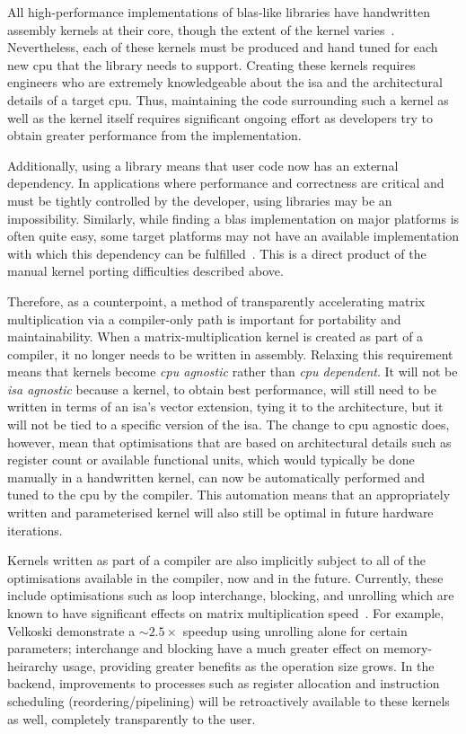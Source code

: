 \documentclass[\main/thesis.tex]{subfiles}
\begin{document}
All high-performance implementations of \gls{blas}-like libraries have handwritten assembly kernels at their core, though the extent of the kernel varies~\autocite{zee2016blis}.
Nevertheless, each of these kernels must be produced and hand tuned for each new \gls{cpu} that the library needs to support.
Creating these kernels requires engineers who are extremely knowledgeable about the \gls{isa} and the architectural details of a target \gls{cpu}.
Thus, maintaining the code surrounding such a kernel as well as the kernel itself requires significant ongoing effort as developers try to obtain greater performance from the implementation.

Additionally, using a library means that user code now has an external dependency.
In applications where performance and correctness are critical and must be tightly controlled by the developer, using libraries may be an impossibility.
Similarly, while finding a \gls{blas} implementation on major platforms is often quite easy, some target platforms may not have an available implementation with which this dependency can be fulfilled~\autocite{zee2016blis}.
This is a direct product of the manual kernel porting difficulties described above.

Therefore, as a counterpoint, a method of transparently accelerating matrix multiplication via a compiler-only path is important for portability and maintainability.
When a matrix-multiplication kernel is created as part of a compiler, it no longer needs to be written in assembly.
Relaxing this requirement means that kernels become \emph{\gls{cpu} agnostic} rather than \emph{\gls{cpu} dependent}.
It will not be \emph{\gls{isa} agnostic} because a kernel, to obtain best performance, will still need to be written in terms of an \gls{isa}'s vector extension, tying it to the architecture, but it will not be tied to a specific version of the \gls{isa}.
The change to \gls{cpu} agnostic does, however, mean that optimisations that are based on architectural details such as register count or available functional units, which would typically be done manually in a handwritten kernel, can now be automatically performed and tuned to the \gls{cpu} by the compiler.
This automation means that an appropriately written and parameterised kernel will also still be optimal in future hardware iterations.

Kernels written as part of a compiler are also implicitly subject to all of the optimisations available in the compiler, now and in the future.
Currently, these include optimisations such as loop interchange, blocking, and unrolling which are known to have significant effects on matrix multiplication speed~\autocite{velkoski2014performance,allen1984automatic,fabeiro2016writing,schreiber1990automatic}.
For example, Velkoski \etal demonstrate a $\sim 2.5 \times$ speedup using unrolling alone for certain parameters; interchange and blocking have a much greater effect on memory-heirarchy usage, providing greater benefits as the operation size grows.
In the backend, improvements to processes such as register allocation and instruction scheduling (reordering/pipelining) will be retroactively available to these kernels as well, completely transparently to the user.
\end{document}
